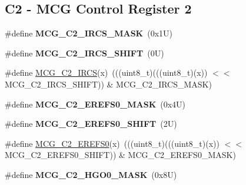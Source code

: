 \subsection*{C2 -\/ M\+CG Control Register 2}
\begin{DoxyCompactItemize}
\item 
\mbox{\label{group___m_c_g___register___masks_gaef3ef9fc35df3b7d404dd2b7279051cb}} 
\#define {\bfseries M\+C\+G\+\_\+\+C2\+\_\+\+I\+R\+C\+S\+\_\+\+M\+A\+SK}~(0x1\+U)
\item 
\mbox{\label{group___m_c_g___register___masks_ga9a364696151f81b7a671bafd25cf16d1}} 
\#define {\bfseries M\+C\+G\+\_\+\+C2\+\_\+\+I\+R\+C\+S\+\_\+\+S\+H\+I\+FT}~(0\+U)
\item 
\#define \mbox{\hyperlink{group___m_c_g___register___masks_gad8f801bcc07391ec8060d0d2249a81be}{M\+C\+G\+\_\+\+C2\+\_\+\+I\+R\+CS}}(x)~(((uint8\+\_\+t)(((uint8\+\_\+t)(x)) $<$$<$ M\+C\+G\+\_\+\+C2\+\_\+\+I\+R\+C\+S\+\_\+\+S\+H\+I\+FT)) \& M\+C\+G\+\_\+\+C2\+\_\+\+I\+R\+C\+S\+\_\+\+M\+A\+SK)
\item 
\mbox{\label{group___m_c_g___register___masks_gae9a32b79976c185a9b6567cc74b2d5af}} 
\#define {\bfseries M\+C\+G\+\_\+\+C2\+\_\+\+E\+R\+E\+F\+S0\+\_\+\+M\+A\+SK}~(0x4\+U)
\item 
\mbox{\label{group___m_c_g___register___masks_ga1cea960436deb685a7f131203e4898b5}} 
\#define {\bfseries M\+C\+G\+\_\+\+C2\+\_\+\+E\+R\+E\+F\+S0\+\_\+\+S\+H\+I\+FT}~(2\+U)
\item 
\#define \mbox{\hyperlink{group___m_c_g___register___masks_gae771ee589559392e587838bc2c4f0c14}{M\+C\+G\+\_\+\+C2\+\_\+\+E\+R\+E\+F\+S0}}(x)~(((uint8\+\_\+t)(((uint8\+\_\+t)(x)) $<$$<$ M\+C\+G\+\_\+\+C2\+\_\+\+E\+R\+E\+F\+S0\+\_\+\+S\+H\+I\+FT)) \& M\+C\+G\+\_\+\+C2\+\_\+\+E\+R\+E\+F\+S0\+\_\+\+M\+A\+SK)
\item 
\mbox{\label{group___m_c_g___register___masks_ga58de06b4d4514888ca2e7cbc68e50ccc}} 
\#define {\bfseries M\+C\+G\+\_\+\+C2\+\_\+\+H\+G\+O0\+\_\+\+M\+A\+SK}~(0x8\+U)
\item 
\mbox{\label{group___m_c_g___register___masks_ga881979b382aef0029c4e4990e365d8f5}} 

\end{DoxyCompactItemize}
